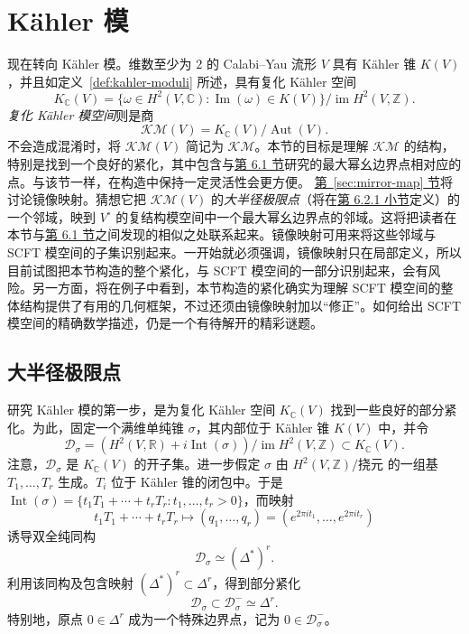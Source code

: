 \section{Kähler 模}\label{sec:kahler-moduli}
现在转向 Kähler 模。维数至少为 $2$ 的 Calabi--Yau 流形 $V$ 具有 Kähler 锥 $K(V)$，并且如定义~\ref{def:kahler-moduli} 所述，具有复化 Kähler 空间
\[
K_{\mathbb C}(V)=\{\omega\in H^2(V,\mathbb C):\operatorname{Im}(\omega)\in K(V)\}/\operatorname{im}H^2(V,\mathbb Z).
\]
\emph{复化 Kähler 模空间}则是商
\[
\mathcal{KM}(V)=K_{\mathbb C}(V)/\operatorname{Aut}(V).
\]
不会造成混淆时，将 $\mathcal{KM}(V)$ 简记为 $\mathcal{KM}$。本节的目标是理解 $\mathcal{KM}$ 的结构，特别是找到一个良好的紧化，其中包含与\hyperref[sec:complex-moduli]{第 6.1 节}研究的最大幂幺边界点相对应的点。与该节一样，在构造中保持一定灵活性会更方便。
\hyperref[sec:mirror-map]{第~\ref*{sec:mirror-map} 节}将讨论镜像映射。猜想它把 $\mathcal{KM}(V)$ 的\emph{大半径极限点}（将在\hyperref[subsec:large-radius-limits]{第 6.2.1 小节}定义）的一个邻域，映到 $V^\circ$ 的复结构模空间中一个最大幂幺边界点的邻域。这将把读者在本节与\hyperref[sec:complex-moduli]{第 6.1 节}之间发现的相似之处联系起来。镜像映射可用来将这些邻域与 SCFT 模空间的子集识别起来。一开始就必须强调，镜像映射只在局部定义，所以目前试图把本节构造的整个紧化，与 SCFT 模空间的一部分识别起来，会有风险。另一方面，将在例子中看到，本节构造的紧化确实为理解 SCFT 模空间的整体结构提供了有用的几何框架，不过还须由镜像映射加以“修正”。如何给出 SCFT 模空间的精确数学描述，仍是一个有待解开的精彩谜题。

\subsection{大半径极限点}\label{subsec:large-radius-limits}
研究 Kähler 模的第一步，是为复化 Kähler 空间 $K_{\mathbb C}(V)$ 找到一些良好的部分紧化。为此，固定一个满维单纯锥 $\sigma$，其内部位于 Kähler 锥 $K(V)$ 中，并令
\[
\mathcal D_\sigma=(H^2(V,\mathbb R)+i\operatorname{Int}(\sigma))/\operatorname{im}H^2(V,\mathbb Z)
\subset K_{\mathbb C}(V).
\]
注意，$\mathcal D_\sigma$ 是 $K_{\mathbb C}(V)$ 的开子集。进一步假定 $\sigma$ 由 $H^2(V,\mathbb Z)/\text{挠元}$ 的一组基 $T_1,\ldots,T_r$ 生成。$T_i$ 位于 Kähler 锥的闭包中。于是
$\operatorname{Int}(\sigma)=\{t_1T_1+\cdots+t_rT_r:t_1,\ldots,t_r>0\}$，而映射
\begin{equation}\label{eq:large-radius-exponential-coordinates}
t_1T_1+\cdots+t_rT_r\longmapsto(q_1,\ldots,q_r)
=(e^{2\pi i t_1},\ldots,e^{2\pi i t_r})
\end{equation}
诱导双全纯同构
\[
\mathcal D_\sigma\simeq(\Delta^*)^r.
\]
利用该同构及包含映射 $(\Delta^*)^r\subset\Delta^r$，得到部分紧化
\[
\mathcal D_\sigma\subset\mathcal D_\sigma^-\simeq\Delta^r.
\]
特别地，原点 $0\in\Delta^r$ 成为一个特殊边界点，记为 $0\in\mathcal D_\sigma^-$。

